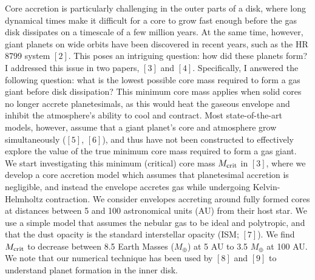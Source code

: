 \documentclass[12pt, letterpaper]{article}
\begin{document}
Core accretion is particularly challenging in the outer parts of a disk, where long dynamical times make it difficult for a core to grow fast enough before the gas disk dissipates on a timescale of a few million years. At the same time, however, giant planets on wide orbits have been discovered in recent years, such as the HR 8799 system $[2]$. This poses an intriguing question: how did these planets form? I addressed this issue in two papers, $[3]$ and $[4]$. Specifically, I answered the following question: what is the lowest possible core mass required to form a gas giant before disk dissipation? This minimum core mass applies when  solid cores no longer accrete planetesimals, as this would heat the gaseous envelope and inhibit the atmosphere's ability to cool and contract. Most state-of-the-art models, however, assume that a giant planet's core and atmosphere grow simultaneously ($[5]$, $[6]$), and thus have not been constructed to effectively explore the value of the true minimum core mass required to form a gas giant. We start investigating this minimum (critical) core mass $M_{\rm crit}$ in $[3]$, where we develop a core accretion model which assumes that planetesimal accretion is negligible, and instead the envelope accretes gas while undergoing Kelvin-Helmholtz contraction. 
We consider envelopes accreting around fully formed cores at distances between 5 and 100 astronomical units (AU) from their host star. We use a simple model that assumes the nebular gas to be ideal and polytropic, and that the dust opacity is the standard interstellar opacity (ISM; $[7]$). We find $M_{\rm crit}$ to decrease between 8.5 Earth Masses ($M_{\oplus}$) at 5 AU to 3.5 $M_{\oplus}$ at 100 AU. 
We note that our numerical technique has been used by $[8]$ and $[9]$ to understand planet formation in the inner disk. 
\end{document}
